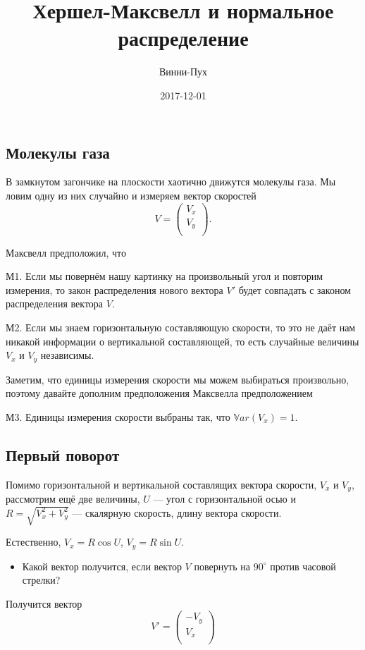 \documentclass[11pt,russian,]{article}
\title{Хершел-Максвелл и нормальное распределение}
\author{Винни-Пух}
\date{2017-12-01}
\providecommand{\tightlist}{%
  \setlength{\itemsep}{0pt}\setlength{\parskip}{0pt}}
\newcommand{\Var}{\mathbb{V}ar}
\begin{document}
\maketitle

{
\setcounter{tocdepth}{2}
\tableofcontents
}
\subsection{Молекулы газа}\label{-}

В замкнутом загончике на плоскости хаотично движутся молекулы газа. Мы
ловим одну из них случайно и измеряем вектор скоростей \[
V = \begin{pmatrix}
V_x \\
V_y \\
\end{pmatrix}.
\]

Максвелл предположил, что

М1. Если мы повернём нашу картинку на произвольный угол и повторим
измерения, то закон распределения нового вектора \(V'\) будет совпадать
с законом распределения вектора \(V\).

М2. Если мы знаем горизонтальную составляющую скорости, то это не даёт
нам никакой информации о вертикальной составляющей, то есть случайные
величины \(V_x\) и \(V_y\) независимы.

Заметим, что единицы измерения скорости мы можем выбираться произвольно,
поэтому давайте дополним предположения Максвелла предположением

М3. Единицы измерения скорости выбраны так, что \(\Var(V_x)=1\).

\subsection{Первый поворот}\label{-}

Помимо горизонтальной и вертикальной составлящих вектора скорости,
\(V_x\) и \(V_y\), рассмотрим ещё две величины, \(U\) --- угол с
горизонтальной осью и \(R=\sqrt{V_x^2+V_y^2}\) --- скалярную скорость,
длину вектора скорости.

Естественно, \(V_x = R\cos U\), \(V_y = R\sin U\).

\begin{itemize}
\tightlist
\item
  Какой вектор получится, если вектор \(V\) повернуть на \(90^{\circ}\)
  против часовой стрелки?
\end{itemize}

Получится вектор \[
V'=\begin{pmatrix}
-V_y \\
V_x \\
\end{pmatrix}
\]
\end{document}
